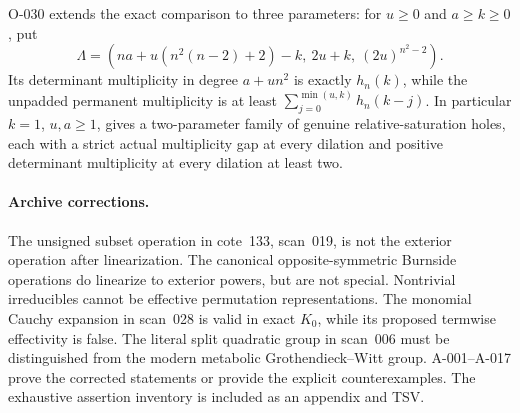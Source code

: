\documentclass[11pt]{article}
\begin{document}
O-030 extends the exact comparison to three parameters:
for \(u\geq0\) and \(a\geq k\geq0\), put
\[
 \Lambda=(na+u(n^2(n-2)+2)-k,\ 2u+k,\ (2u)^{n^2-2}).
\]
Its determinant multiplicity in degree \(a+un^2\) is exactly
\(h_n(k)\), while the unpadded permanent multiplicity is at least
\(\sum_{j=0}^{\min(u,k)}h_n(k-j)\).
In particular \(k=1\), \(u,a\geq1\), gives a two-parameter
family of genuine relative-saturation holes, each with a strict
actual multiplicity gap at every dilation and positive determinant
multiplicity at every dilation at least two.

\paragraph{Archive corrections.}
The unsigned subset operation in cote~133, scan~019, is not the
exterior operation after linearization. The canonical opposite-symmetric
Burnside operations do linearize to exterior powers, but are not
special. Nontrivial irreducibles cannot be effective permutation
representations. The monomial Cauchy expansion in scan~028 is valid
in exact \(K_0\), while its proposed termwise effectivity is false.
The literal split quadratic group in scan~006 must be distinguished
from the modern metabolic Grothendieck--Witt group. A-001--A-017
prove the corrected statements or provide the explicit counterexamples.
The exhaustive assertion inventory is included as an appendix and TSV.
\end{document}
